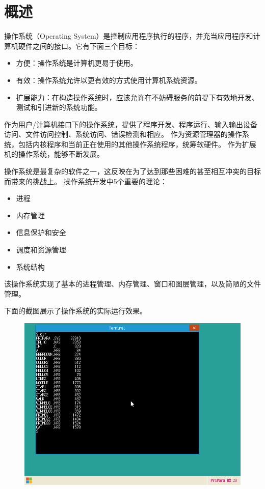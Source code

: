 \section{概述}

操作系统（Operating System）是控制应用程序执行的程序，并充当应用程序和计算机硬件之间的接口。它有下面三个目标：
\begin{itemize}
  \item 方便：操作系统是计算机更易于使用。
  \item 有效：操作系统允许以更有效的方式使用计算机系统资源。
  \item 扩展能力：在构造操作系统时，应该允许在不妨碍服务的前提下有效地开发、测试和引进新的系统功能。
\end{itemize}

作为用户/计算机接口下的操作系统，提供了程序开发、程序运行、输入输出设备访问、文件访问控制、系统访问、错误检测和相应。
作为资源管理器的操作系统，包括内核程序和当前正在使用的其他操作系统程序，统筹软硬件。
作为扩展机的操作系统，能够不断发展。

操作系统是最复杂的软件之一，这反映在为了达到那些困难的甚至相互冲突的目标而带来的挑战上。
操作系统开发中5个重要的理论\cite{denn80a}：
\begin{itemize}
  \item 进程
  \item 内存管理
  \item 信息保护和安全
  \item 调度和资源管理
  \item 系统结构
\end{itemize}

该操作系统实现了基本的进程管理、内存管理、窗口和图层管理，以及简陋的文件管理。

下面的截图展示了操作系统的实际运行效果。

\begin{figure}[htp]
    \centering
    \includegraphics[width=12cm]{image/p1.png}
    \caption{}
    \label{fig:p1}
\end{figure}


